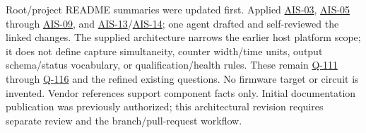 Root/project README summaries were updated first. Applied \hyperref[Skill:AIS-03]{AIS-03}, \hyperref[Skill:AIS-05]{AIS-05} through \hyperref[Skill:AIS-09]{AIS-09}, and \hyperref[Skill:AIS-13]{AIS-13}/\hyperref[Skill:AIS-14]{AIS-14}; one agent drafted and self-reviewed the linked changes. The supplied architecture narrows the earlier host platform scope; it does not define capture simultaneity, counter width/time units, output schema/status vocabulary, or qualification/health rules. These remain \hyperref[Question:Q-111]{Q-111} through \hyperref[Question:Q-116]{Q-116} and the refined existing questions. No firmware target or circuit is invented. Vendor references support component facts only. Initial documentation publication was previously authorized; this architectural revision requires separate review and the branch/pull-request workflow.
